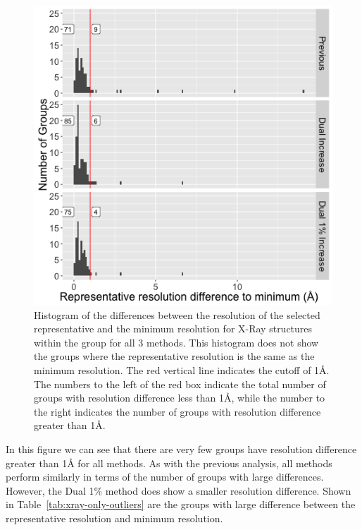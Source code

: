 \begin{figure}
  \includegraphics[width=0.5\linewidth]{chapter-4/figs/xray-res-diff}
  \caption{Histogram of the differences between the resolution of the selected
    representative and the minimum resolution for X-Ray structures within the
    group for all 3 methods. This histogram does not show the groups where the
    representative resolution is the same as the minimum resolution.  The red
    vertical line indicates the cutoff of 1{\AA}. The numbers to the left of the
    red box indicate the total number of groups with resolution difference less
    than 1{\AA}, while the number to the right indicates the number of groups
    with resolution
  difference greater than 1{\AA}.}
  \label{fig:xray-only-diff}
\end{figure}

In this figure we can see that there are very few groups have resolution
difference greater than 1\AA{} for all methods. As with the previous analysis, all
methods perform similarly in terms of the number of groups with large
differences. However, the Dual 1\% method does show a smaller resolution
difference. Shown in Table~\ref{tab:xray-only-outliers} are the groups with large
difference between the representative resolution and minimum resolution.

